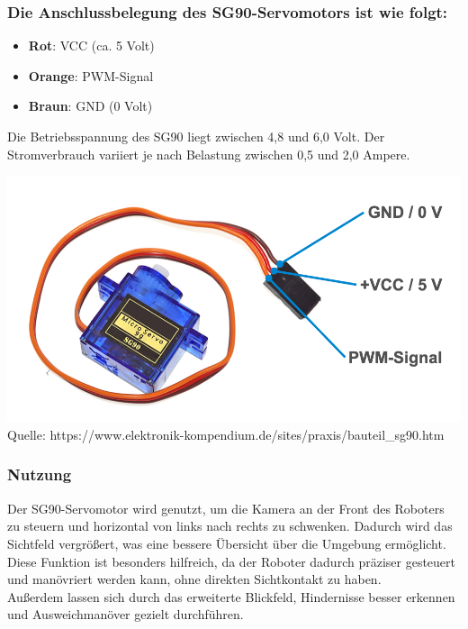 \documentclass[ngerman,12pt,a4paper]{article}
\begin{document}
				\subsubsection*{Die Anschlussbelegung des SG90-Servomotors ist wie folgt:}
				\begin{itemize}
					\item \textbf{Rot}: VCC (ca. 5 Volt)
					\item \textbf{Orange}: PWM-Signal
					\item \textbf{Braun}: GND (0 Volt)
				\end{itemize}
				Die Betriebsspannung des SG90 liegt zwischen 4,8 und 6,0 Volt. Der Stromverbrauch variiert je nach Belastung zwischen 0,5 und 2,0 Ampere.  
				\begin{center}
					\begin{minipage}{0.9\textwidth}
						\centering
						\includegraphics[width=\textwidth]{Pictures/sg90}
						\label{fig:sg90}
						\vspace{5pt}
						{\small Quelle: {https://www.elektronik-kompendium.de/sites/praxis/bauteil\_sg90.htm}}
					\end{minipage}
				\end{center}
				\newpage \noindent
				
				\subsubsection{Nutzung} %
				Der SG90-Servomotor wird genutzt, um die Kamera an der Front des Roboters zu steuern und horizontal von links nach rechts zu schwenken. Dadurch wird das Sichtfeld vergrößert, was eine bessere Übersicht über die Umgebung ermöglicht. \\
				Diese Funktion ist besonders hilfreich, da der Roboter dadurch präziser gesteuert und manövriert werden kann, ohne direkten Sichtkontakt zu haben.\\
				Außerdem lassen sich durch das erweiterte Blickfeld, Hindernisse besser erkennen und Ausweichmanöver gezielt durchführen.
\end{document}
